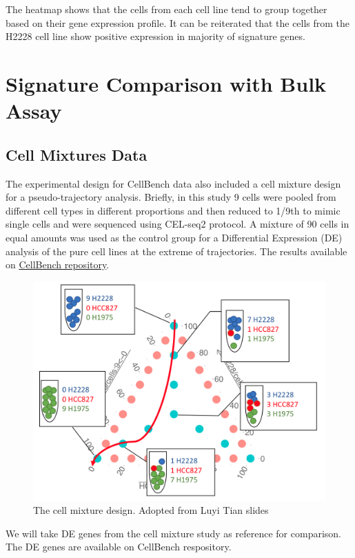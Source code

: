 \documentclass[]{book}
\theoremstyle{definition}
\theoremstyle{definition}
\theoremstyle{definition}
\theoremstyle{remark}
\begin{document}
The heatmap shows that the cells from each cell line tend to group
together based on their gene expression profile. It can be reiterated
that the cells from the H2228 cell line show positive expression in
majority of signature genes.

\hypertarget{signature-comparison-with-bulk-assay}{%
\section{Signature Comparison with Bulk
Assay}\label{signature-comparison-with-bulk-assay}}

\hypertarget{cell-mixtures-data}{%
\subsection{Cell Mixtures Data}\label{cell-mixtures-data}}

The experimental design for CellBench data also included a cell mixture
design for a pseudo-trajectory analysis. Briefly, in this study 9 cells
were pooled from different cell types in different proportions and then
reduced to 1/9th to mimic single cells and were sequenced using CEL-seq2
protocol. A mixture of 90 cells in equal amounts was used as the control
group for a Differential Expression (DE) analysis of the pure cell lines
at the extreme of trajectories. The results available on
\href{https://github.com/LuyiTian/CellBench_data/tree/master/data}{CellBench
repository}.

\begin{figure}[ht]

{\centering \includegraphics[width=0.55\linewidth]{figures/9cellmix} 

}

\caption{The cell mixture design. Adopted from Luyi Tian slides}\label{fig:2-cellmixdesign}
\end{figure}

We will take DE genes from the cell mixture study as reference for
comparison. The DE genes are available on CellBench respository.
\end{document}
